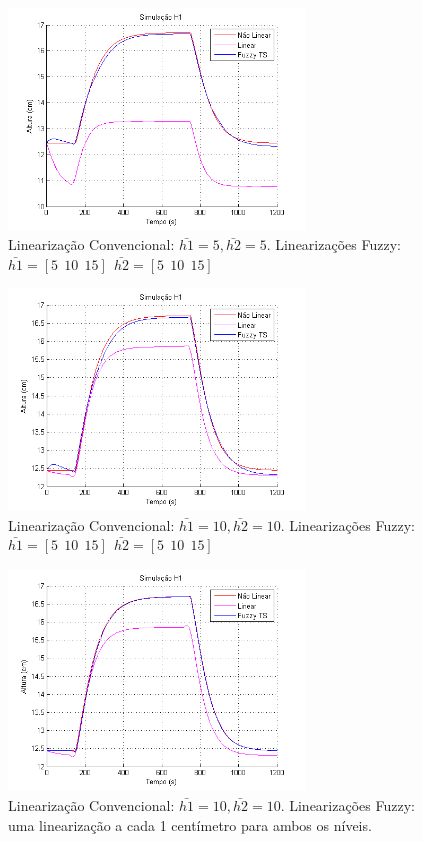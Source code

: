 \begin{figure}[H]
	\centering
	\includegraphics[width=0.7\textwidth]{img/h1Fuz5_10_15.png}
	\caption{\small Linearização Convencional: $ \bar{h1}=5, \bar{h2}=5$. Linearizações Fuzzy: $\bar{h1}=[5 \ \ 10 \ \ 15] \ \ \bar{h2}=[5 \ \ 10 \ \ 15]$ }
	\label{figH1FNM_2}
\end{figure}

\begin{figure}[H]
	\centering
	\includegraphics[width=0.7\textwidth]{img/h1conv10.png}
	\caption{\small Linearização Convencional: $ \bar{h1}=10, \bar{h2}=10$. Linearizações Fuzzy: $\bar{h1}=[5 \ \ 10 \ \ 15] \ \ \bar{h2}=[5 \ \ 10 \ \ 15]$ }
	\label{figH1FNM_3}
\end{figure}

\begin{figure}[H]
	\centering
	\includegraphics[width=0.7\textwidth]{img/h1Fuz_1to30.png}
	\caption{\small Linearização Convencional: $ \bar{h1}=10, \bar{h2}=10$. Linearizações Fuzzy: uma linearização a cada 1 centímetro para ambos os níveis.}
	\label{figH1FNM_4}
\end{figure}

